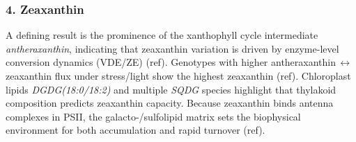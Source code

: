 \documentclass[10pt,letterpaper]{article}
\begin{document}
\begin{itemize}


\subsubsection*{4. Zeaxanthin}
A defining result is the prominence of the xanthophyll cycle intermediate \textit{antheraxanthin}, indicating that zeaxanthin variation is driven by enzyme-level conversion dynamics (VDE/ZE) (ref). Genotypes with higher antheraxanthin{\,$\leftrightarrow$\,}zeaxanthin flux under stress/light show the highest zeaxanthin (ref).
Chloroplast lipids \textit{DGDG(18{:}0/18{:}2)} and multiple \textit{SQDG} species highlight that thylakoid composition predicts zeaxanthin capacity. Because zeaxanthin binds antenna complexes in PSII, the galacto-/sulfolipid matrix sets the biophysical environment for both accumulation and rapid turnover (ref).


\end{itemize}
\end{document}
